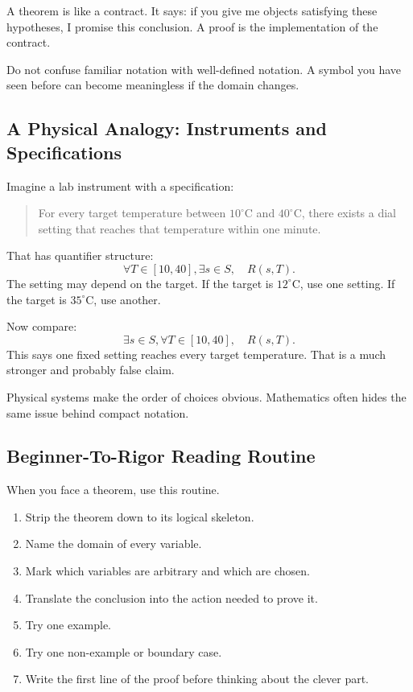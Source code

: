 A theorem is like a contract. It says: if you give me objects satisfying these hypotheses, I promise this conclusion. A proof is the implementation of the contract.

\begin{trapbox}
Do not confuse familiar notation with well-defined notation. A symbol you have seen before can become meaningless if the domain changes.
\end{trapbox}

\subsection{A Physical Analogy: Instruments and Specifications}

Imagine a lab instrument with a specification:

\begin{quote}
For every target temperature between $10^\circ$C and $40^\circ$C, there exists a dial setting that reaches that temperature within one minute.
\end{quote}

That has quantifier structure:
\[
\forall T\in[10,40],\exists s\in S,\quad R(s,T).
\]
The setting may depend on the target. If the target is $12^\circ$C, use one setting. If the target is $35^\circ$C, use another.

Now compare:
\[
\exists s\in S,\forall T\in[10,40],\quad R(s,T).
\]
This says one fixed setting reaches every target temperature. That is a much stronger and probably false claim.

Physical systems make the order of choices obvious. Mathematics often hides the same issue behind compact notation.

\subsection{Beginner-To-Rigor Reading Routine}

When you face a theorem, use this routine.

\begin{enumerate}
\item Strip the theorem down to its logical skeleton.
\item Name the domain of every variable.
\item Mark which variables are arbitrary and which are chosen.
\item Translate the conclusion into the action needed to prove it.
\item Try one example.
\item Try one non-example or boundary case.
\item Write the first line of the proof before thinking about the clever part.
\end{enumerate}

